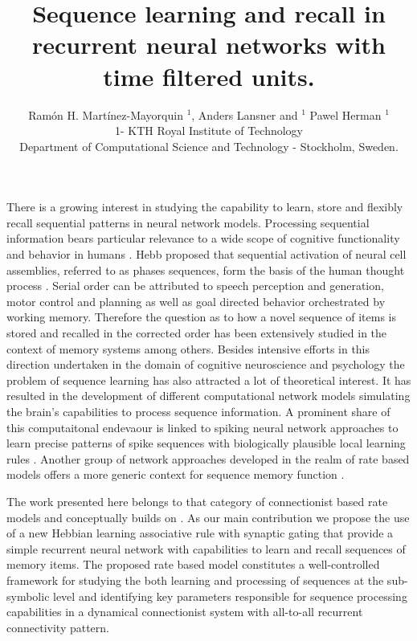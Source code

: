 \documentclass[10pt, a4paper]{article}
\title{Sequence learning and recall in recurrent neural networks with time filtered units.}
\author{Ram\'on H. Mart\'inez-Mayorquin $^1$, Anders Lansner and $^1$ Pawel Herman $^1$
%
%
\vspace{.3cm}\\
%
1- KTH Royal Institute of Technology \\
Department of Computational Science and Technology - Stockholm, Sweden.
%
\vspace{.3cm}\\ 
}
\begin{document}
\maketitle

There is a growing interest in studying the capability to learn, store and flexibly recall sequential patterns in neural network models. Processing sequential information bears particular relevance to a wide scope of cognitive functionality and behavior in humans \cite{lashley1951problem}. Hebb proposed that sequential activation of neural cell assemblies, referred to as phases sequences, form the basis of the human thought process \cite{hebb2005organization}. Serial order can be attributed to speech perception and generation, motor control and planning as well as goal directed behavior orchestrated by working memory. Therefore the question as to how a novel sequence of items is stored and recalled in the corrected order has been extensively studied in the context of memory systems among others. Besides intensive efforts in this direction undertaken in the domain of cognitive neuroscience and psychology \cite{hurlstone2014memory} the problem of sequence learning has also attracted a lot of theoretical interest. It has resulted in the development of different computational network models simulating the brain's capabilities to process sequence information. A prominent share of this computaitonal endevaour is linked to spiking neural network approaches to learn precise patterns of spike sequences with biologically plausible local learning rules \cite{ans1994neural}\cite{dehaene1987neural}\cite{gutig2006tempotron}\cite{ponulak2010supervised}. Another group of network approaches developed in the realm of rate based models offers a more generic context for sequence memory function \cite{amari1972learning}\cite{kohonen1977principle}\cite{sandberg2002bayesian}. 


The work presented here belongs to that category of connectionist based rate models and conceptually builds on \cite{sandberg2002bayesian}. As our main contribution we propose the use of a new Hebbian learning associative rule with synaptic gating \cite{andrew2003spiking} that provide a simple recurrent neural network with capabilities to learn and recall sequences of memory items. The proposed rate based model constitutes a well-controlled framework for studying the both learning and processing of sequences at the sub-symbolic level and identifying key parameters responsible for sequence processing capabilities in a dynamical connectionist system with all-to-all recurrent connectivity pattern. 
\end{document}
